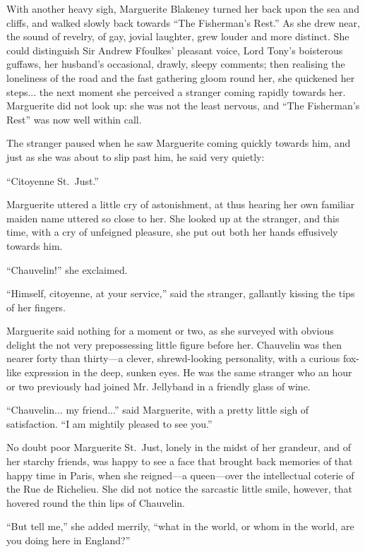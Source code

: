 \documentclass[paper=a5,BCOR=7mm,twoside,DIV=calc,12pt,usegeometry,chapterprefix,endperiod,headings=big]{scrbook}
\begin{document}
With another heavy sigh, Marguerite Blakeney turned her back upon the sea and cliffs, and walked slowly back towards \enquote{The Fisherman's Rest.} As she drew near, the sound of revelry, of gay, jovial laughter, grew louder and more distinct. She could distinguish Sir Andrew Ffoulkes’ pleasant voice, Lord Tony's boisterous guffaws, her husband's occasional, drawly, sleepy comments; then realising the loneliness of the road and the fast gathering gloom round her, she quickened her steps... the next moment she perceived a stranger coming rapidly towards her. Marguerite did not look up: she was not the least nervous, and \enquote{The Fisherman's Rest} was now well within call.

The stranger paused when he saw Marguerite coming quickly towards him, and just as she was about to slip past him, he said very quietly:

\enquote{Citoyenne St.~Just.}

Marguerite uttered a little cry of astonishment, at thus hearing her own familiar maiden name uttered so close to her. She looked up at the stranger, and this time, with a cry of unfeigned pleasure, she put out both her hands effusively towards him.

\enquote{Chauvelin!} she exclaimed.

\enquote{Himself, citoyenne, at your service,} said the stranger, gallantly kissing the tips of her fingers.

Marguerite said nothing for a moment or two, as she surveyed with obvious delight the not very prepossessing little figure before her. Chauvelin was then nearer forty than thirty---a clever, shrewd-looking personality, with a curious fox-like expression in the deep, sunken eyes. He was the same stranger who an hour or two previously had joined Mr. Jellyband in a friendly glass of wine.

\enquote{Chauvelin... my friend...} said Marguerite, with a pretty little sigh of satisfaction. \enquote{I am mightily pleased to see you.}

No doubt poor Marguerite St.~Just, lonely in the midst of her grandeur, and of her starchy friends, was happy to see a face that brought back memories of that happy time in Paris, when she reigned---a queen---over the intellectual coterie of the Rue de Richelieu. She did not notice the sarcastic little smile, however, that hovered round the thin lips of Chauvelin.

\enquote{But tell me,} she added merrily, \enquote{what in the world, or whom in the world, are you doing here in England?}
\end{document}

